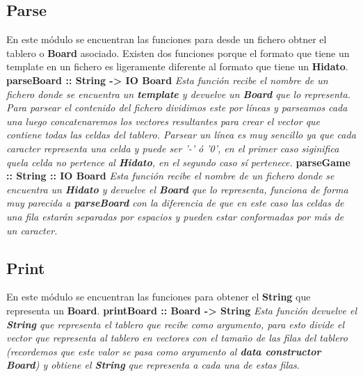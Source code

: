 \documentclass[12pt]{article}
\begin{document}
\subsection{Parse}
En este m\'odulo se encuentran las funciones para desde un fichero obtner el tablero o {\bf Board} asociado. Existen dos funciones porque el formato que tiene un template en un fichero es ligeramente
diferente al formato que tiene un {\bf Hidato}.
\newline \newline
{\bf parseBoard :: String -> IO Board}\newline
{\it Esta funci\'on recibe el nombre de un fichero donde se encuentra un {\bf template} y devuelve un {\bf Board} que lo representa. Para parsear el contenido del fichero dividimos este por l\'ineas y parseamos cada una luego concatenaremos los vectores 
resultantes para crear el vector que contiene todas las celdas del tablero. Parsear un l\'inea es muy sencillo ya que cada caracter representa una celda y puede ser '-' \'o '0', en el primer caso siginifica quela celda no pertence al {\bf Hidato}, en el segundo caso
s\'i pertenece.}
\newline \newline
{\bf parseGame :: String :: IO Board}\newline
{\it Esta funci\'on recibe el nombre de un fichero donde se encuentra un {\bf Hidato} y devuelve el {\bf Board} que lo representa, funciona de forma muy parecida a {\bf parseBoard} con la diferencia de que en este caso las celdas de una fila estar\'an separadas por espacios y pueden estar
conformadas por m\'as de un caracter.}
\newline \newline
\subsection{Print}
En este m\'odulo se encuentran las funciones para obtener el {\bf String} que representa un {\bf Board}.
\newline \newline
{\bf printBoard :: Board -> String}\newline
{\it Esta funci\'on devuelve el {\bf String} que representa el tablero que recibe como argumento, para esto divide el vector que representa al tablero en vectores con el tama\~no de las filas del tablero (recordemos que este valor se pasa como argumento al {\bf data constructor Board}) y obtiene el {\bf String} que representa a cada una de estas filas}.
\newline \newline
\end{document}
